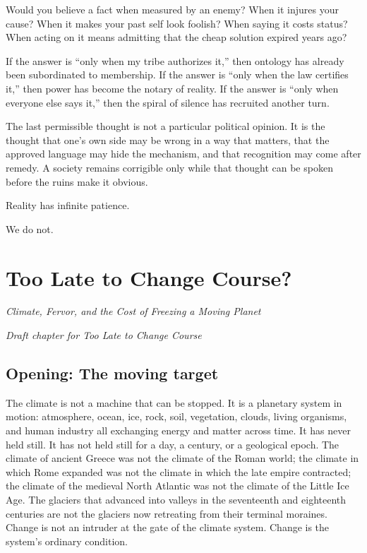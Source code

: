 ﻿\documentclass[12pt,a4paper]{book}
\begin{document}
Would you believe a fact when measured by an enemy? When it injures your cause? When it makes your past self look foolish? When saying it costs status? When acting on it means admitting that the cheap solution expired years ago?

If the answer is “only when my tribe authorizes it,” then ontology has already been subordinated to membership. If the answer is “only when the law certifies it,” then power has become the notary of reality. If the answer is “only when everyone else says it,” then the spiral of silence has recruited another turn.

The last permissible thought is not a particular political opinion. It is the thought that one's own side may be wrong in a way that matters, that the approved language may hide the mechanism, and that recognition may come after remedy. A society remains corrigible only while that thought can be spoken before the ruins make it obvious.

Reality has infinite patience.

We do not.


\chapter{Too Late to Change Course?}
\begin{center}\Large\itshape Climate, Fervor, and the Cost of Freezing a Moving Planet\end{center}
\begin{center}\small\itshape Draft chapter for Too Late to Change Course\end{center}
\vspace{1em}
\section{Opening: The moving target}
The climate is not a machine that can be stopped. It is a planetary system in motion: atmosphere, ocean, ice, rock, soil, vegetation, clouds, living organisms, and human industry all exchanging energy and matter across time. It has never held still. It has not held still for a day, a century, or a geological epoch. The climate of ancient Greece was not the climate of the Roman world; the climate in which Rome expanded was not the climate in which the late empire contracted; the climate of the medieval North Atlantic was not the climate of the Little Ice Age. The glaciers that advanced into valleys in the seventeenth and eighteenth centuries are not the glaciers now retreating from their terminal moraines. Change is not an intruder at the gate of the climate system. Change is the system's ordinary condition.
\end{document}
